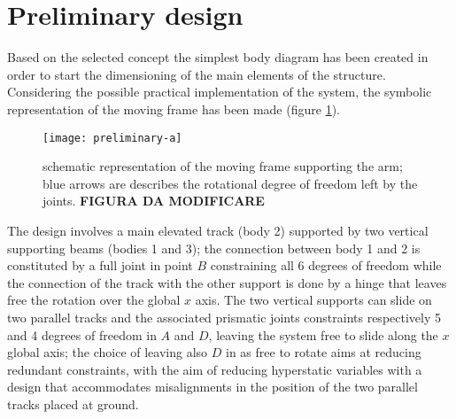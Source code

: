 \section{Preliminary design}
	Based on the selected concept the simplest body diagram has been created in order to start the dimensioning of the main elements of the structure. Considering the possible practical implementation of the system, the symbolic representation of the moving frame has been made (figure \ref{fig:freebodydiagramframe}).
	
	\begin{figure}[bht]
		\centering \texttt{[image: preliminary-a]}
		\caption{schematic representation of the moving frame supporting the arm; blue arrows are describes the rotational degree of freedom left by the joints. \textbf{FIGURA DA MODIFICARE}}
		\label{fig:freebodydiagramframe}
	\end{figure}
	
	The design involves a main elevated track (body 2) supported by two vertical supporting beams (bodies 1 and 3); the connection between body 1 and 2 is constituted by a full joint in point $B$ constraining all 6 degrees of freedom while the connection of the track with the other support is done by a hinge that leaves free the rotation over the global $x$ axis. The two vertical supports can slide on two parallel tracks and the associated prismatic joints constraints respectively 5 and 4 degrees of freedom in $A$ and $D$, leaving the system free to slide along the $x$ global axis; the choice of leaving also $D$ in as free to rotate aims at reducing redundant constraints, with the aim of reducing hyperstatic variables with a design that accommodates misalignments in the position of the two parallel tracks placed at ground.
	

